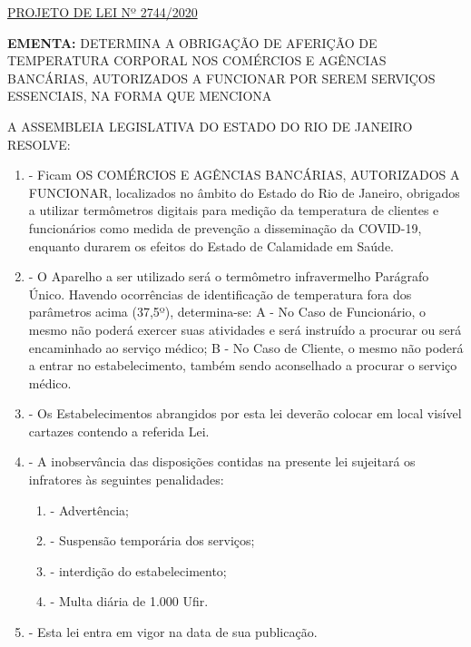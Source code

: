 \documentclass[10pt]{article}
\date{}
\begin{document}
\maketitle
\begin{center}
  \huge
  \vspace{-3cm}\href{http://alerjln1.alerj.rj.gov.br/scpro1923.nsf/f4b46b3cdbba990083256cc900746cf6/7c79328e377226f80325856d003f1393?OpenDocument}{PROJETO DE LEI Nº 2744/2020}
\bigskip
\bigskip
\bigskip
  
\end{center}

\textbf{EMENTA:} 
DETERMINA A OBRIGAÇÃO DE AFERIÇÃO DE TEMPERATURA CORPORAL NOS COMÉRCIOS E AGÊNCIAS BANCÁRIAS, AUTORIZADOS A FUNCIONAR POR SEREM SERVIÇOS ESSENCIAIS, NA FORMA QUE MENCIONA








\bigskip

\noindent
A ASSEMBLEIA LEGISLATIVA DO ESTADO DO RIO DE JANEIRO RESOLVE:

\begin{enumerate}[label=Art. \arabic*\textdegree]
\item - Ficam OS COMÉRCIOS E AGÊNCIAS BANCÁRIAS, AUTORIZADOS A FUNCIONAR, localizados no âmbito do Estado do Rio de Janeiro, obrigados a utilizar termômetros digitais para medição da temperatura de clientes e funcionários como medida de prevenção a disseminação da COVID-19, enquanto durarem os efeitos do Estado de Calamidade em Saúde.
\item - O Aparelho a ser utilizado será o termômetro infravermelho
Parágrafo Único. Havendo ocorrências de identificação de temperatura fora dos parâmetros acima (37,5º), determina-se:
A - No Caso de Funcionário, o mesmo não poderá exercer suas atividades e será instruído a procurar ou será encaminhado ao serviço médico;
B - No Caso de Cliente, o mesmo não poderá a entrar no estabelecimento, também sendo aconselhado a procurar o serviço médico.
\item - Os Estabelecimentos abrangidos por esta lei deverão colocar em local visível cartazes contendo a referida Lei.
\item - A inobservância das disposições contidas na presente lei sujeitará os infratores às seguintes penalidades:
\begin{enumerate}[label=\Roman*]
\item - Advertência;
\item - Suspensão temporária dos serviços;
\item - interdição do estabelecimento;
\item - Multa diária de 1.000 Ufir.
\end{enumerate}
\item - Esta lei entra em vigor na data de sua publicação.

\end{enumerate}
\end{document}
